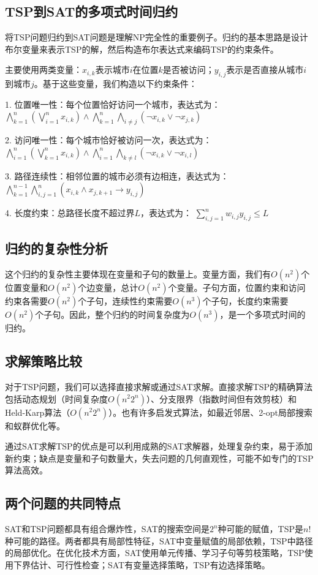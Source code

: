 \documentclass[a4paper,12pt]{ctexart}
\begin{document}
\subsection{TSP到SAT的多项式时间归约}
将TSP问题归约到SAT问题是理解NP完全性的重要例子。归约的基本思路是设计布尔变量来表示TSP的解，然后构造布尔表达式来编码TSP的约束条件。

主要使用两类变量：$x_{i,k}$表示城市$i$在位置$k$是否被访问；$y_{i,j}$表示是否直接从城市$i$到城市$j$。基于这些变量，我们构造以下约束条件：

1. 位置唯一性：每个位置恰好访问一个城市，表达式为：
   $\bigwedge_{k=1}^n \left(\bigvee_{i=1}^n x_{i,k}\right) \wedge \bigwedge_{k=1}^n \bigwedge_{i \neq j} (\neg x_{i,k} \vee \neg x_{j,k})$

2. 访问唯一性：每个城市恰好被访问一次，表达式为：
   $\bigwedge_{i=1}^n \left(\bigvee_{k=1}^n x_{i,k}\right) \wedge \bigwedge_{i=1}^n \bigwedge_{k \neq l} (\neg x_{i,k} \vee \neg x_{i,l})$

3. 路径连续性：相邻位置的城市必须有边相连，表达式为：
   $\bigwedge_{k=1}^{n-1} \bigwedge_{i,j=1}^n (x_{i,k} \wedge x_{j,k+1} \rightarrow y_{i,j})$

4. 长度约束：总路径长度不超过界$L$，表达式为：
   $\sum_{i,j=1}^n w_{i,j}y_{i,j} \leq L$

\subsection{归约的复杂性分析}
这个归约的复杂性主要体现在变量和子句的数量上。变量方面，我们有$O(n^2)$个位置变量和$O(n^2)$个边变量，总计$O(n^2)$个变量。子句方面，位置约束和访问约束各需要$O(n^2)$个子句，连续性约束需要$O(n^3)$个子句，长度约束需要$O(n^2)$个子句。因此，整个归约的时间复杂度为$O(n^3)$，是一个多项式时间的归约。

\subsection{求解策略比较}
对于TSP问题，我们可以选择直接求解或通过SAT求解。直接求解TSP的精确算法包括动态规划（时间复杂度$O(n^2 2^n)$）、分支限界（指数时间但有效剪枝）和Held-Karp算法（$O(n^2 2^n)$）。也有许多启发式算法，如最近邻居、2-opt局部搜索和蚁群优化等。

通过SAT求解TSP的优点是可以利用成熟的SAT求解器，处理复杂约束，易于添加新约束；缺点是变量和子句数量大，失去问题的几何直观性，可能不如专门的TSP算法高效。

\subsection{两个问题的共同特点}
SAT和TSP问题都具有组合爆炸性，SAT的搜索空间是$2^n$种可能的赋值，TSP是$n!$种可能的路径。两者都具有局部性特征，SAT中变量赋值的局部依赖，TSP中路径的局部优化。在优化技术方面，SAT使用单元传播、学习子句等剪枝策略，TSP使用下界估计、可行性检查；SAT有变量选择策略，TSP有边选择策略。
\end{document}
